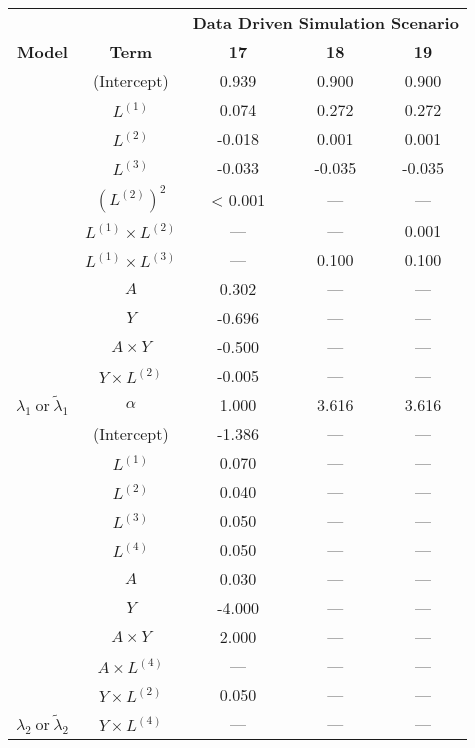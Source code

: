 \begin{sidewaystable}
\begin{minipage}[t]{0.5\textwidth}
\begin{tabular}[t]{>{}cccc>{}c}
\hline
\multicolumn{1}{c}{\textbf{ }} & \multicolumn{1}{c}{\textbf{ }} & \multicolumn{3}{c}{\textbf{Data Driven Simulation Scenario}} \\
\cmidrule{3-5}
\textbf{Model} & \textbf{Term} & \textbf{17} & \textbf{18} & \textbf{19}\\
\hline
 & (Intercept) & 0.939 & 0.900 & 0.900\\
\cmidrule{2-5}
 & $L^{(1)}$ & 0.074 & 0.272 & 0.272\\
\cmidrule{2-5}
 & $L^{(2)}$ & -0.018 & 0.001 & 0.001\\
\cmidrule{2-5}
 & $L^{(3)}$ & -0.033 & -0.035 & -0.035\\
\cmidrule{2-5}
 & $(L^{(2)})^2$ & < 0.001 & --- & ---\\
\cmidrule{2-5}
 & $L^{(1)} \times L^{(2)}$ & --- & --- & 0.001\\
\cmidrule{2-5}
 & $L^{(1)} \times L^{(3)}$ & --- & 0.100 & 0.100\\
\cmidrule{2-5}
 & $A$ & 0.302 & --- & ---\\
\cmidrule{2-5}
 & $Y$ & -0.696 & --- & ---\\
\cmidrule{2-5}
 & $A\times Y$ & -0.500 & --- & ---\\
\cmidrule{2-5}
 & $Y \times L^{(2)}$ & -0.005 & --- & ---\\
\cmidrule{2-5}
\multirow{-12}{*}{\centering\arraybackslash $\lambda_1~\text{or}~\tilde\lambda_1$} & $\alpha$ & 1.000 & 3.616 & 3.616\\
\cmidrule{1-5}
 & (Intercept) & -1.386 & --- & ---\\
\cmidrule{2-5}
 & $L^{(1)}$ & 0.070 & --- & ---\\
\cmidrule{2-5}
 & $L^{(2)}$ & 0.040 & --- & ---\\
\cmidrule{2-5}
 & $L^{(3)}$ & 0.050 & --- & ---\\
\cmidrule{2-5}
 & $L^{(4)}$ & 0.050 & --- & ---\\
\cmidrule{2-5}
 & $A$ & 0.030 & --- & ---\\
\cmidrule{2-5}
 & $Y$ & -4.000 & --- & ---\\
\cmidrule{2-5}
 & $A\times Y$ & 2.000 & --- & ---\\
\cmidrule{2-5}
 & $A \times L^{(4)}$ & --- & --- & ---\\
\cmidrule{2-5}
 & $Y \times L^{(2)}$ & 0.050 & --- & ---\\
\cmidrule{2-5}
\multirow{-11}{*}{\centering\arraybackslash $\lambda_2~\text{or}~\tilde\lambda_2$} & $Y \times L^{(4)}$ & --- & --- & ---\\
\hline
\end{tabular}
\end{minipage}
\end{sidewaystable}
